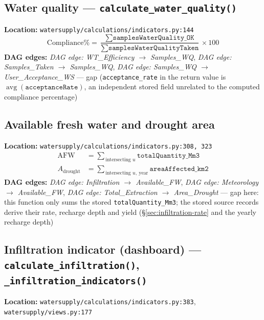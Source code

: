 \documentclass[11pt]{article}
\newcommand{\code}[1]{\texttt{#1}}
\newcommand{\dagedge}[1]{\textit{DAG edge: #1}}
\newcommand{\statusgap}{\textcolor{red!70!black}{gap}}
\begin{document}
\subsection{Water quality --- \code{calculate\_water\_quality()}}
\textbf{Location:} \code{watersupply/calculations/indicators.py:144}
\begin{equation}
  \text{Compliance\%} = \frac{\sum \texttt{samplesWaterQuality\_OK}}{\sum \texttt{samplesWaterQualityTaken}} \times 100
\end{equation}
\textbf{DAG edges:} \dagedge{WT\_Efficiency $\rightarrow$ Samples\_WQ}, \dagedge{Samples\_Taken $\rightarrow$ Samples\_WQ}, \dagedge{Samples\_WQ $\rightarrow$ User\_Acceptance\_WS} --- \statusgap{} (\code{acceptance\_rate} in the return value is $\operatorname{avg}(\texttt{acceptanceRate})$, an independent stored field unrelated to the computed compliance percentage)

\subsection{Available fresh water and drought area}
\textbf{Location:} \code{watersupply/calculations/indicators.py:308, 323}
\begin{align}
  \text{AFW} &= \sum_{\,\text{intersecting } u} \texttt{totalQuantity\_Mm3} \\
  A_{\text{drought}} &= \sum_{\,\text{intersecting } u,\ \text{year}} \texttt{areaAffected\_km2}
\end{align}
\textbf{DAG edges:} \dagedge{Infiltration $\rightarrow$ Available\_FW}, \dagedge{Meteorology $\rightarrow$ Available\_FW}, \dagedge{Total\_Extraction $\rightarrow$ Area\_Drought} --- \statusgap{} here: this function only sums the stored \texttt{totalQuantity\_Mm3}; the stored source records derive their rate, recharge depth and yield (\S\ref{sec:infiltration-rate} and the yearly recharge depth)

\subsection{Infiltration indicator (dashboard) --- \code{calculate\_infiltration()}, \code{\_infiltration\_indicators()}}
\label{sec:infiltration-indicator}
\textbf{Location:} \code{watersupply/calculations/indicators.py:383}, \code{watersupply/views.py:177}
\end{document}
